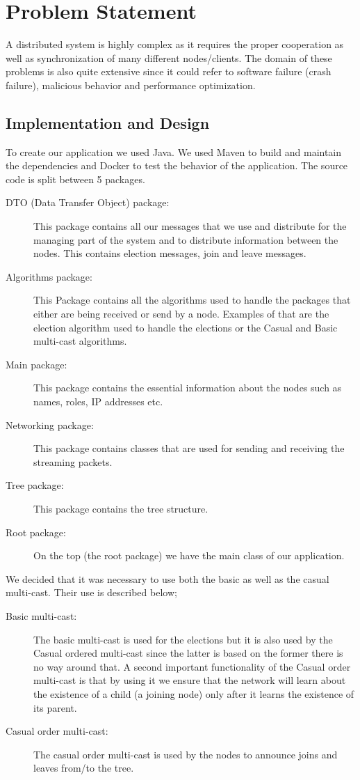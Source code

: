 \section{Problem Statement}
\label{ps}

A distributed system is highly complex as it requires the proper cooperation as well as synchronization of many different nodes/clients. The domain of these problems is also quite extensive since it could refer to software failure (crash failure), malicious behavior and performance optimization. \\

\subsection{Implementation and Design}
To create our application we used Java. We used Maven to build and maintain the dependencies and Docker to test the behavior of the application. The source code is split between 5 packages.

\begin{description}
	\item[DTO (Data Transfer Object) package: ] This package contains all our messages that we use and distribute for the managing part of the system and to distribute information between the nodes. This contains election messages, join and leave messages.
	\item[Algorithms package: ] This Package contains all the algorithms used to handle the packages that either are being received or send by a node. Examples of that are the election algorithm used to handle the elections or the Casual and Basic multi-cast algorithms.
	\item[Main package: ] This package contains the essential information about the nodes such as names, roles, IP addresses etc.
	\item[Networking package: ] This package contains classes that are used for sending and receiving the streaming packets.
	\item[Tree package: ] This package contains the tree structure.
	\item[Root package: ] On the top (the root package) we have the main class of our application. 
\end{description}

We decided that it was necessary to use both the basic as well as the casual multi-cast. Their use is described below;

\begin{description}
	\item[Basic multi-cast: ] The basic multi-cast is used for the elections but it is also used by the Casual ordered multi-cast since the latter is based on the former there is no way around that. A second important functionality of the Casual order multi-cast is that by using it we ensure that the network will learn about the existence of a child (a joining node) only after it learns the existence of its parent.
	\item[Casual order multi-cast: ] The casual order multi-cast is used by the nodes to announce joins and leaves from/to the tree. 
\end{description}

